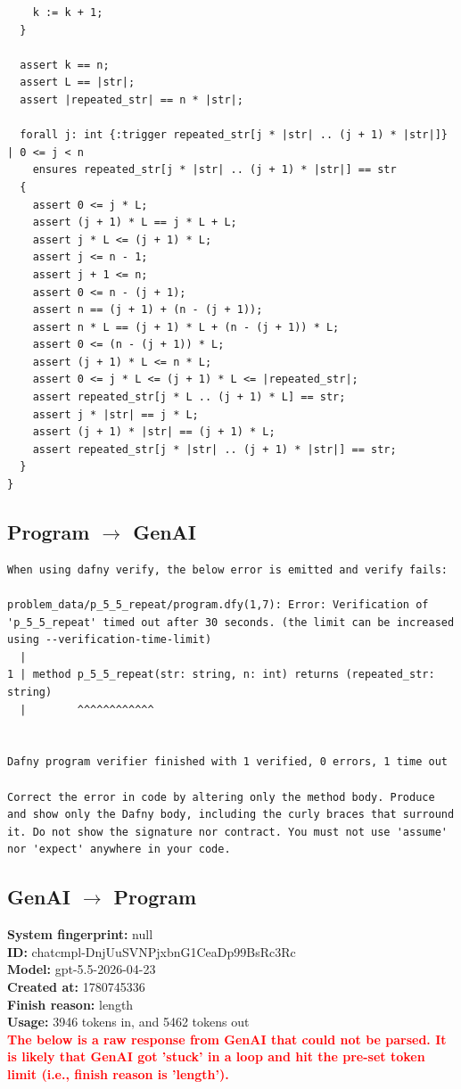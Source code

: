 \documentclass{article}
\begin{document}
\begin{lstlisting}
    k := k + 1;
  }

  assert k == n;
  assert L == |str|;
  assert |repeated_str| == n * |str|;

  forall j: int {:trigger repeated_str[j * |str| .. (j + 1) * |str|]} | 0 <= j < n
    ensures repeated_str[j * |str| .. (j + 1) * |str|] == str
  {
    assert 0 <= j * L;
    assert (j + 1) * L == j * L + L;
    assert j * L <= (j + 1) * L;
    assert j <= n - 1;
    assert j + 1 <= n;
    assert 0 <= n - (j + 1);
    assert n == (j + 1) + (n - (j + 1));
    assert n * L == (j + 1) * L + (n - (j + 1)) * L;
    assert 0 <= (n - (j + 1)) * L;
    assert (j + 1) * L <= n * L;
    assert 0 <= j * L <= (j + 1) * L <= |repeated_str|;
    assert repeated_str[j * L .. (j + 1) * L] == str;
    assert j * |str| == j * L;
    assert (j + 1) * |str| == (j + 1) * L;
    assert repeated_str[j * |str| .. (j + 1) * |str|] == str;
  }
}
\end{lstlisting}
\subsection*{Program $\rightarrow$ GenAI}
\begin{lstlisting}
When using dafny verify, the below error is emitted and verify fails:

problem_data/p_5_5_repeat/program.dfy(1,7): Error: Verification of 'p_5_5_repeat' timed out after 30 seconds. (the limit can be increased using --verification-time-limit)
  |
1 | method p_5_5_repeat(str: string, n: int) returns (repeated_str: string)
  |        ^^^^^^^^^^^^


Dafny program verifier finished with 1 verified, 0 errors, 1 time out

Correct the error in code by altering only the method body. Produce and show only the Dafny body, including the curly braces that surround it. Do not show the signature nor contract. You must not use 'assume' nor 'expect' anywhere in your code.
\end{lstlisting}
\subsection*{GenAI $\rightarrow$ Program}
\textbf{System fingerprint: }null
\\\textbf{ID: }chatcmpl-DnjUuSVNPjxbnG1CeaDp99BsRc3Rc
\\\textbf{Model: }gpt-5.5-2026-04-23
\\\textbf{Created at: }1780745336
\\\textbf{Finish reason: }length
\\\textbf{Usage: }3946 tokens in, and 5462 tokens out
\\\textcolor{red}{\textbf{The below is a raw response from GenAI that could not be parsed. It is likely that GenAI got 'stuck' in a loop and hit the pre-set token limit (i.e., finish reason is 'length').}}
\begin{lstlisting}

\end{lstlisting}
\end{document}
